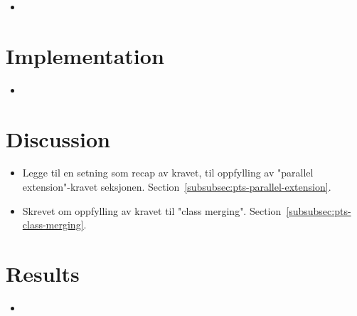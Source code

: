 \begin{itemize}
    \item
\end{itemize}

\section*{Implementation}

\begin{itemize}
    \item
\end{itemize}

\section*{Discussion}

\begin{itemize}
    \item Legge til en setning som recap av kravet, til oppfylling av "parallel extension"-kravet seksjonen.
    Section~\vref{subsubsec:pts-parallel-extension}.
    \item Skrevet om oppfylling av kravet til "class merging".
    Section~\vref{subsubsec:pts-class-merging}.
\end{itemize}

\section*{Results}

\begin{itemize}
    \item
\end{itemize}
